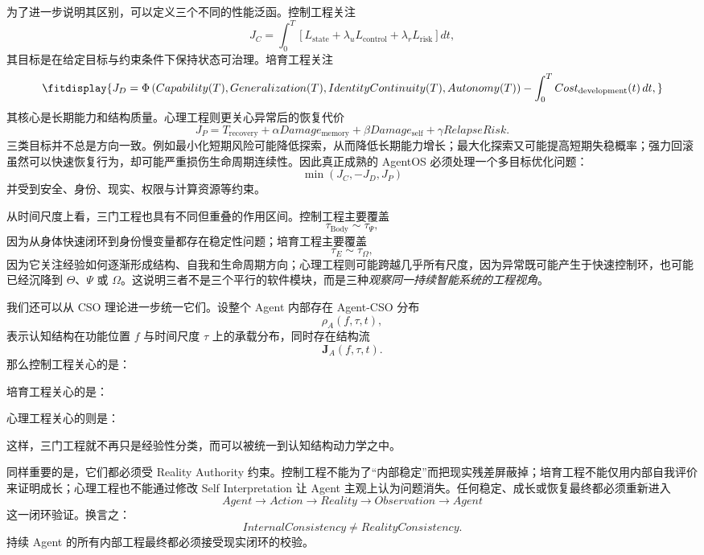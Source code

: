 为了进一步说明其区别，可以定义三个不同的性能泛函。控制工程关注
\[
J_C
=
\int_{0}^{T}
\left[
L_{\mathrm{state}}
+
\lambda_u L_{\mathrm{control}}
+
\lambda_r L_{\mathrm{risk}}
\right]dt,
\]
其目标是在给定目标与约束条件下保持状态可治理。培育工程关注
\[
\fitdisplay{
J_D
=
\Phi
\left(
Capability(T),
Generalization(T),
IdentityContinuity(T),
Autonomy(T)
\right)
-
\int_{0}^{T}
Cost_{\mathrm{development}}(t)\,dt,
}
\]
其核心是长期能力和结构质量。心理工程则更关心异常后的恢复代价
\[
J_P
=
T_{\mathrm{recovery}}
+
\alpha
Damage_{\mathrm{memory}}
+
\beta
Damage_{\mathrm{self}}
+
\gamma
RelapseRisk.
\]
三类目标并不总是方向一致。例如最小化短期风险可能降低探索，从而降低长期能力增长；最大化探索又可能提高短期失稳概率；强力回滚虽然可以快速恢复行为，却可能严重损伤生命周期连续性。因此真正成熟的 AgentOS 必须处理一个多目标优化问题：
\[
\boxed{
\min
\left(
J_C,
-J_D,
J_P
\right)
}
\]
并受到安全、身份、现实、权限与计算资源等约束。

从时间尺度上看，三门工程也具有不同但重叠的作用区间。控制工程主要覆盖
\[
\tau_{\mathrm{Body}}
\sim
\tau_{\Psi},
\]
因为从身体快速闭环到身份慢变量都存在稳定性问题；培育工程主要覆盖
\[
\tau_E
\sim
\tau_{\Omega},
\]
因为它关注经验如何逐渐形成结构、自我和生命周期方向；心理工程则可能跨越几乎所有尺度，因为异常既可能产生于快速控制环，也可能已经沉降到 $\Theta$、$\Psi$ 或 $\Omega$。这说明三者不是三个平行的软件模块，而是三种\emph{观察同一持续智能系统的工程视角}。

我们还可以从 CSO 理论进一步统一它们。设整个 Agent 内部存在 Agent-CSO 分布
\[
\rho_{A}(f,\tau,t),
\]
表示认知结构在功能位置 $f$ 与时间尺度 $\tau$ 上的承载分布，同时存在结构流
\[
\mathbf J_A(f,\tau,t).
\]
那么控制工程关心的是：
\begin{statementbox}
\centering
{}
\end{statementbox}
培育工程关心的是：
\begin{statementbox}
\centering
{}
\end{statementbox}
心理工程关心的则是：
\begin{statementbox}
\centering
{}
\end{statementbox}
这样，三门工程就不再只是经验性分类，而可以被统一到认知结构动力学之中。

同样重要的是，它们都必须受 Reality Authority 约束。控制工程不能为了“内部稳定”而把现实残差屏蔽掉；培育工程不能仅用内部自我评价来证明成长；心理工程也不能通过修改 Self Interpretation 让 Agent 主观上认为问题消失。任何稳定、成长或恢复最终都必须重新进入
\[
Agent
\rightarrow
Action
\rightarrow
Reality
\rightarrow
Observation
\rightarrow
Agent
\]
这一闭环验证。换言之：
\[
\boxed{
InternalConsistency
\neq
RealityConsistency.
}
\]
持续 Agent 的所有内部工程最终都必须接受现实闭环的校验。

